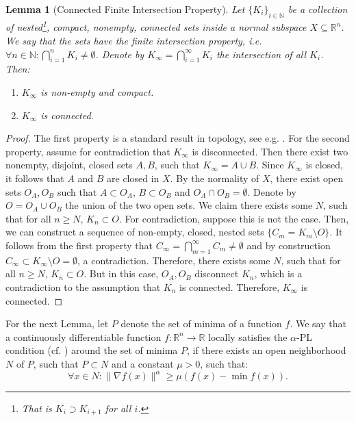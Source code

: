 \documentclass{article}
\newtheorem{lemma}{Lemma}
\newcommand{\R}{\mathbb{R}}
\newcommand{\N}{\mathbb{N}}
\begin{document}
\begin{lemma} [Connected Finite Intersection Property]
    \label{lem:finiteintersection}
    Let $\{ K_i \}_{i\in \N}$ be a collection of nested\footnote{That is $K_i\supset K_{i+1}$ for all $i$.}, compact, nonempty, connected sets inside a normal subspace $X\subseteq\R^n$. We say that the sets have the \emph{finite intersection property}, i.e. $\forall n \in \N: \bigcap_{i=1}^n K_i \neq \emptyset$.
    Denote by $K_\infty = \bigcap_{i=1}^\infty K_i$ the intersection of all $K_i$. Then:
    \begin{enumerate}
        \item $K_\infty$ is non-empty and compact.
        \item $K_\infty$ is connected.
    \end{enumerate}
\end{lemma}
\begin{proof}
    The first property is a standard result in topology, see e.g. \citet[Thm. 26.9]{Munkres2014Topology}. For the second property, assume for contradiction that $K_\infty$ is disconnected. Then there exist two nonempty, disjoint, closed sets $A,B$, such that $K_\infty = A \cup B$. Since $K_\infty$ is closed, it follows that $A$ and $B$ are closed in $X$. By the normality of $X$, there exist open sets $O_A,O_B$ such that $A\subset O_A$, $B\subset O_B$ and $O_A \cap O_B = \emptyset$.
    Denote by $O = O_A \cup O_B$ the union of the two open sets. We claim there exists some $N$, such that for all $n\geq N$, $K_n \subset O$. 
    For contradiction, suppose this is not the case. Then, we can construct a sequence of non-empty, closed, nested sets $\{C_m= K_m \setminus O\}$. It follows from the first property that $C_\infty=\bigcap_{m=1}^\infty C_m \neq \emptyset$ and by construction $C_\infty \subset K_\infty\setminus O = \emptyset$, a contradiction. Therefore, there exists some $N$, such that for all $n\geq N$, $K_n \subset O$.
    But in this case, $O_A,O_B$ disconnect $K_n$, which is a contradiction to the assumption that $K_n$ is connected. Therefore, $K_\infty$ is connected.
\end{proof}








For the next Lemma, let $P$ denote the set of minima of a function $f$. We say that a continuously differentiable function $f:\R^n \to \R$ locally satisfies the $\alpha$-PL condition (cf. ) around the set of minima $P$, if there exists an open neighborhood $N$ of $P$, such that $P \subset N$ and a constant $\mu>0$, such that:
    \[
    \forall x \in N: \|\nabla f(x)\|^\alpha \geq \mu \left(f(x) - \min f(x)\right).
    \]
\end{document}
